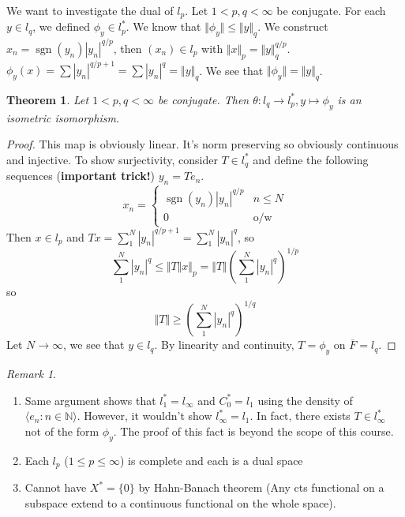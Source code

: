 \documentclass{article}
\theoremstyle{definition}
\theoremstyle{remark}
\newtheorem{rem}{Remark}
\theoremstyle{plain}
\newtheorem{thm}[defn]{Theorem}
\newcommand{\NN}{\mathbb{N}}
\begin{document}
We want to investigate the dual of $l_p$. Let $1<p,q<\infty$ be conjugate. For each $y\in l_q$, we defined $\phi_y\in l_p^\ast$. We know that $\Vert\phi_y\Vert\le\Vert y\Vert_q$. We construct $x_n=\operatorname{sgn}(y_n)|y_n|^{q/p}$, then $(x_n)\in l_p$ with $\Vert x\Vert_p=\Vert y\Vert_q^{q/p}$. $\phi_y(x)=\sum |y_n|^{q/p+1}=\sum |y_n|^q=\Vert y\Vert_q$. We see that $\Vert \phi_y\Vert=\Vert y\Vert_q$.
\begin{thm}
    Let $1<p,q<\infty$ be conjugate. Then $\theta:l_q\to l_p^\ast, y\mapsto \phi_y$ is an isometric isomorphism.
\end{thm}
\begin{proof}
    This map is obviously linear. It's norm preserving so obviously continuous and injective. To show surjectivity, consider $T\in l_q^\ast$ and define the following sequences (\textbf{important trick!}) $y_n=Te_n$.
    \[x_n=\begin{cases}
    \operatorname{sgn}(y_n)|y_n|^{q/p} & n\le N\\
    0 & \text{o/w}
    \end{cases}\]
    Then $x\in l_p$ and $Tx=\sum_1^N|y_n|^{q/p+1}=\sum_1^N|y_n|^q$, so $$\sum_1^N|y_n|^q\le\Vert T\Vert x\Vert_p=\Vert T\Vert\left(\sum_1^N|y_n|^q\right)^{1/p}$$
    so
    \[\Vert T\Vert\ge \left(\sum_1^N|y_n|^q\right)^{1/q}\]
    Let $N\to\infty$, we see that $y\in l_q$. By linearity and continuity, $T=\phi_y$ on $\overline{F}=l_q$.
\end{proof}
\begin{rem}
    \begin{enumerate}
        \item Same argument shows that $l_1^\ast=l_\infty$ and $C_0^\ast=l_1$ using the density of $\langle e_n:n\in \NN\rangle$.
        However, it wouldn't show $l_\infty^\ast=l_1$. In fact, there exists $T\in l_\infty^\ast$ not of the form $\phi_y$. The proof of this fact is beyond the scope of this course.
        \item Each $l_p$ ($1\le p\le \infty$) is complete and each is a dual space
        \item Cannot have $X^\ast=\{0\}$ by Hahn-Banach theorem (Any cts functional on a subspace extend to a continuous functional on the whole space).
    \end{enumerate}
\end{rem}
\end{document}
